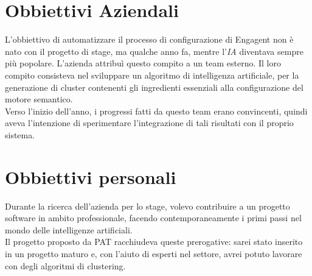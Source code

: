 \section{Obbiettivi Aziendali}
L'obbiettivo di automatizzare il processo di configurazione di Engagent non è nato con il progetto di stage, ma qualche anno fa, mentre l'\textit{IA} diventava sempre più popolare. L'azienda attribuì questo compito a un team esterno. Il loro compito consisteva nel sviluppare un algoritmo di intelligenza artificiale, per la generazione di cluster contenenti gli ingredienti essenziali alla configurazione del motore semantico.\\
Verso l'inizio dell'anno, i progressi fatti da questo team erano convincenti, quindi \company aveva l'intenzione di sperimentare l'integrazione di tali risultati con il proprio sistema.

\section{Obbiettivi personali}

Durante la ricerca dell'azienda per lo stage, volevo contribuire a un progetto software in ambito professionale, facendo contemporaneamente i primi passi nel mondo delle intelligenze artificiali.\\
Il progetto proposto da PAT racchiudeva queste prerogative: sarei stato inserito in un progetto maturo e, con l'aiuto di esperti nel settore, avrei potuto lavorare con degli algoritmi di clustering.   

